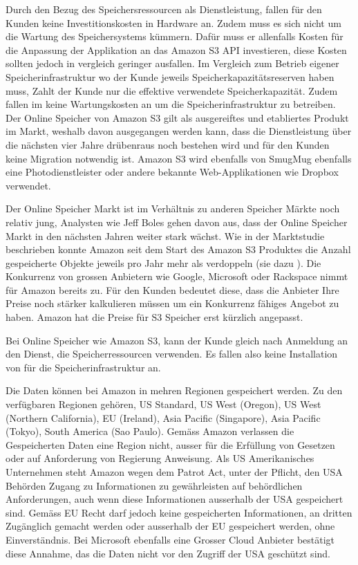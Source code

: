 Durch den Bezug des Speichersressourcen als Dienstleistung, fallen für den Kunden keine Investitionskosten in Hardware an. Zudem muss es sich nicht um die Wartung des Speichersystems kümmern. Dafür muss er allenfalls Kosten für die Anpassung der Applikation an das Amazon S3 API investieren, diese Kosten sollten jedoch in vergleich geringer ausfallen. Im Vergleich zum Betrieb eigener Speicherinfrastruktur wo der Kunde jeweils Speicherkapazitätsreserven haben muss, Zahlt der Kunde nur die effektive verwendete Speicherkapazität. Zudem fallen im keine Wartungskosten an um die Speicherinfrastruktur zu betreiben. Der Online Speicher von Amazon S3 gilt als ausgereiftes und etabliertes Produkt im Markt, weshalb davon ausgegangen werden kann, dass die Dienstleistung über die nächsten vier Jahre drübenraus noch bestehen wird und für den Kunden keine Migration notwendig ist. Amazon S3 wird ebenfalls von SmugMug ebenfalls eine Photodienstleister oder andere bekannte Web-Applikationen wie Dropbox verwendet.\cite{SmugMug}\cite{Dropbox2011}

Der Online Speicher Markt ist im Verhältnis zu anderen Speicher Märkte noch relativ jung, Analysten wie Jeff Boles gehen davon aus, dass der Online Speicher Markt in den nächsten Jahren weiter stark wächst. Wie in der Marktstudie beschrieben konnte Amazon seit dem Start des Amazon S3 Produktes die Anzahl gespeicherte Objekte jeweils pro Jahr mehr als verdoppeln (sie dazu ). Die Konkurrenz von grossen Anbietern wie Google, Microsoft oder Rackspace nimmt für Amazon bereits zu. Für den Kunden bedeutet diese, dass die Anbieter Ihre Preise noch stärker kalkulieren müssen um ein Konkurrenz fähiges Angebot zu haben. Amazon hat die Preise für S3 Speicher erst kürzlich angepasst.\cite{Boles2011}\cite{Barr2012a}

Bei Online Speicher wie Amazon S3, kann der Kunde gleich nach Anmeldung an den Dienst, die Speicherressourcen verwenden. Es fallen also keine Installation von für
die Speicherinfrastruktur an. 

Die Daten können bei Amazon in mehren Regionen gespeichert werden. Zu den verfügbaren Regionen gehören, US Standard, US West (Oregon), US West (Northern California), EU (Ireland), Asia Pacific (Singapore), Asia Pacific (Tokyo), South America (Sao Paulo). Gemäss Amazon verlassen die Gespeicherten Daten eine Region nicht, ausser für die Erfüllung von Gesetzen oder auf Anforderung von Regierung Anweisung. Als US Amerikanisches Unternehmen steht Amazon wegen dem Patrot Act, unter der Pflicht, den USA Behörden Zugang zu Informationen zu gewährleisten auf behördlichen Anforderungen, auch wenn diese Informationen ausserhalb der USA gespeichert sind. Gemäss EU Recht darf jedoch keine gespeicherten Informationen, an dritten Zugänglich gemacht werden oder ausserhalb der EU gespeichert werden, ohne Einverständnis. Bei Microsoft ebenfalls eine Grosser Cloud Anbieter bestätigt diese Annahme, das die Daten nicht vor den Zugriff der USA geschützt sind.\cite{Amazon2012}\cite{Ostler}

